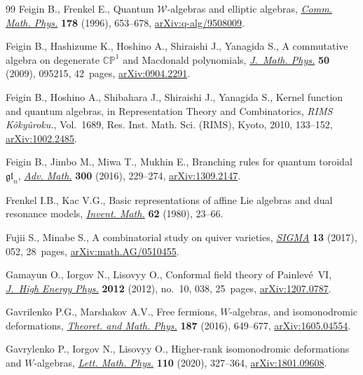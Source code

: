 \documentclass[pdftex]{sigma}
\numberwithin{equation}{section}
\theoremstyle{definition}
\begin{document}
\begin{thebibliography}{99}
Feigin B., Frenkel E., Quantum {$\mathcal W$}-algebras and elliptic algebras,
 \href{https://doi.org/10.1007/BF02108819}{\textit{Comm. Math. Phys.}} \textbf{178} (1996), 653--678,
 \href{https://arxiv.org/abs/q-alg/9508009}{arXiv:q-alg/9508009}.

Feigin B., Hashizume K., Hoshino A., Shiraishi J., Yanagida S., A commutative
 algebra on degenerate {$\mathbb{CP}^1$} and {M}acdonald polynomials,
 \href{https://doi.org/10.1063/1.3192773}{\textit{J.~Math. Phys.}} \textbf{50} (2009), 095215, 42~pages,
 \href{https://arxiv.org/abs/0904.2291}{arXiv:0904.2291}.

Feigin B., Hoshino A., Shibahara J., Shiraishi J., Yanagida S., Kernel function
 and quantum algebras, in Representation Theory and Combinatorics,
 \textit{RIMS K\^oky\^uroku.}, Vol.~1689, Res. Inst. Math. Sci. (RIMS), Kyoto,
 2010, 133--152, \href{https://arxiv.org/abs/1002.2485}{arXiv:1002.2485}.

Feigin B., Jimbo M., Miwa T., Mukhin E., Branching rules for quantum toroidal
 {$\mathfrak{gl}_n$}, \href{https://doi.org/10.1016/j.aim.2016.03.019}{\textit{Adv. Math.}} \textbf{300} (2016), 229--274,
 \href{https://arxiv.org/abs/1309.2147}{arXiv:1309.2147}.

Frenkel I.B., Kac V.G., Basic representations of affine {L}ie algebras and dual
 resonance models, \href{https://doi.org/10.1007/BF01391662}{\textit{Invent. Math.}} \textbf{62} (1980), 23--66.

Fujii S., Minabe S., A combinatorial study on quiver varieties, \href{https://doi.org/10.3842/SIGMA.2017.052}{\textit{SIGMA}}
 \textbf{13} (2017), 052, 28~pages, \href{https://arxiv.org/abs/math.AG/0510455}{arXiv:math.AG/0510455}.

Gamayun O., Iorgov N., Lisovyy O., Conformal field theory of {P}ainlev\'e~{VI},
 \href{https://doi.org/10.1007/JHEP10(2012)038}{\textit{J.~High Energy Phys.}} \textbf{2012} (2012), no.~10, 038, 25~pages,
 \href{https://arxiv.org/abs/1207.0787}{arXiv:1207.0787}.

Gavrilenko P.G., Marshakov A.V., Free fermions, {$W$}-algebras, and
 isomonodromic deformations, \href{https://doi.org/10.1134/S0040577916050044}{\textit{Theoret. and Math. Phys.}} \textbf{187}
 (2016), 649--677, \href{https://arxiv.org/abs/1605.04554}{arXiv:1605.04554}.

Gavrylenko P., Iorgov N., Lisovyy O., Higher-rank isomonodromic deformations
 and {$W$}-algebras, \href{https://doi.org/10.1007/s11005-019-01207-6}{\textit{Lett. Math. Phys.}} \textbf{110} (2020), 327--364,
 \href{https://arxiv.org/abs/1801.09608}{arXiv:1801.09608}.


\end{thebibliography}
\end{document}
